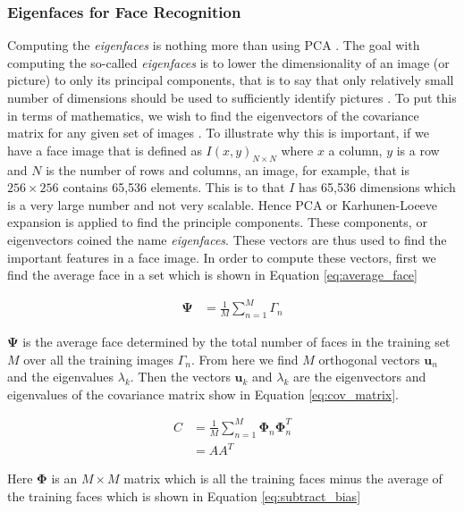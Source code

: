 \documentclass[
	submission,
	final,
	notitlepage,
	narroweqnarray,
	inline,
	twoside,
	]{ieee}
\begin{document}
\subsubsection{Eigenfaces for Face Recognition}
Computing the \textit{eigenfaces} is nothing more than using PCA \cite{eigen_faces}. 
The goal with computing the so-called \textit{eigenfaces} is to lower the dimensionality
of an image (or picture) to only its principal components, that is to say
that only relatively small number of dimensions should be used
to sufficiently identify pictures \cite{eigen_faces}. To put this in 
terms of mathematics, we wish to find the eigenvectors of the covariance
matrix for any given set of images \cite{eigen_face_recognition}. To 
illustrate why this is important, if we have a face image that is defined 
as $I(x,y)_{N \times N}$ where $x$ a column, $y$ is a row and $N$ is the
number of rows and columns, an image, for example, that is $256 \times 256$ contains 65,536 elements.
This is to that $I$ has 65,536 dimensions which is a very large number
and not very scalable. Hence PCA or Karhunen-Loeeve expansion is 
applied to find the principle components. These components, or 
eigenvectors coined the name \textit{eigenfaces}. These vectors are thus
used to find the important features in a face image. In order to compute
these vectors, first we
find the average face in a set which is shown in Equation \ref{eq:average_face}

\begin{align}
  \mathbf{\Psi} &= \frac{1}{M} \sum_{n=1}^{M}\Gamma_n \label{eq:average_face}
\end{align}

$\mathbf{\Psi}$ is the average face determined by the total number of faces
in the training set $M$ over all the training images $\Gamma_n$. From 
here we find $M$ orthogonal vectors $\mathbf{u}_n$ and the eigenvalues
$\lambda_k$. Then the vectors $\mathbf{u}_k$ and $\lambda_k$ are the 
eigenvectors and eigenvalues of the covariance matrix show in Equation
\ref{eq:cov_matrix}.


\begin{align}
  C &= \frac{1}{M} \sum_{n=1}^M \mathbf{\Phi}_n \mathbf{\Phi}_n^T \label{eq:cov_matrix} \\
  &= AA^T
\end{align}

Here $\mathbf{\Phi}$ is an $M \times M$ matrix  which is all the 
training faces minus the average of the training faces which is
shown in Equation \ref{eq:subtract_bias}
\end{document}
